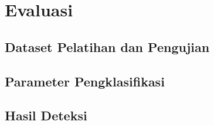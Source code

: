 
\chapter{Evaluasi}
\label{bab:04}


	\section{Dataset Pelatihan dan Pengujian}
	\label{bab:04:dataset}
	

	\section{Parameter Pengklasifikasi}
	\label{bab:04:parameter}
	

	\section{Hasil Deteksi}
	\label{bab:04:hasil_deteksi}
	
